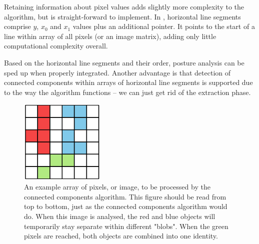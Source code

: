 \documentclass[9pt,lineno]{elife}
\newcommand{\TRex}{\protect\path{TRex}}
\begin{document}
\begin{appendixbox}
Retaining information about pixel values adds slightly more complexity to the algorithm, but is straight-forward to implement. In \TRex{}, horizontal line segments comprise $y$, $x_0$ and $x_1$ values plus an additional pointer. It points to the start of a line within array of all pixels (or an image matrix), adding only little computational complexity overall.

Based on the horizontal line segments and their order, posture analysis can be sped up when properly integrated. Another advantage is that detection of connected components within arrays of horizontal line segments is supported due to the way the algorithm functions -- we can just get rid of the extraction phase.

\end{appendixbox}

\begin{figure}[b]
    \centering
    \includegraphics[width=0.36\textwidth]{figures/connected_component.pdf}
    \caption{An example array of pixels, or image, to be processed by the connected components algorithm. This figure should be read from top to bottom, just as the connected components algorithm would do. When this image is analysed, the red and blue objects will temporarily stay separate within different "blobs". When the green pixels are reached, both objects are combined into one identity.}
	\label{fig:connected_component}
\end{figure}
\end{document}
